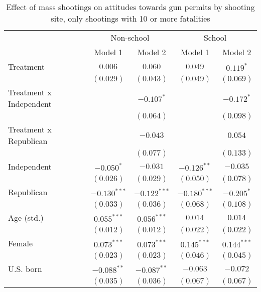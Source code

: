 
\begin{table}
\caption{Effect of mass shootings on attitudes towards gun permits by shooting site, only shootings with 10 or more fatalities}
\begin{center}
\begin{tabular}{l c c c c}
\toprule
 & \multicolumn{2}{c}{Non-school} & \multicolumn{2}{c}{School} \\
\cmidrule(lr){2-3} \cmidrule(lr){4-5}
 & Model 1 & Model 2 & Model 1 & Model 2 \\
\midrule
Treatment               & $0.006$        & $0.060$        & $0.049$        & $0.119^{*}$    \\
                        & $(0.029)$      & $(0.043)$      & $(0.049)$      & $(0.069)$      \\
Treatment x Independent &                & $-0.107^{*}$   &                & $-0.172^{*}$   \\
                        &                & $(0.064)$      &                & $(0.098)$      \\
Treatment x Republican  &                & $-0.043$       &                & $0.054$        \\
                        &                & $(0.077)$      &                & $(0.133)$      \\
Independent             & $-0.050^{*}$   & $-0.031$       & $-0.126^{**}$  & $-0.035$       \\
                        & $(0.026)$      & $(0.029)$      & $(0.050)$      & $(0.078)$      \\
Republican              & $-0.130^{***}$ & $-0.122^{***}$ & $-0.180^{***}$ & $-0.205^{*}$   \\
                        & $(0.033)$      & $(0.036)$      & $(0.068)$      & $(0.108)$      \\
Age (std.)              & $0.055^{***}$  & $0.056^{***}$  & $0.014$        & $0.014$        \\
                        & $(0.012)$      & $(0.012)$      & $(0.022)$      & $(0.022)$      \\
Female                  & $0.073^{***}$  & $0.073^{***}$  & $0.145^{***}$  & $0.144^{***}$  \\
                        & $(0.023)$      & $(0.023)$      & $(0.046)$      & $(0.045)$      \\
U.S. born               & $-0.088^{**}$  & $-0.087^{**}$  & $-0.063$       & $-0.072$       \\
                        & $(0.035)$      & $(0.036)$      & $(0.067)$      & $(0.067)$      \\

\end{tabular}
\end{center}
\end{table}
